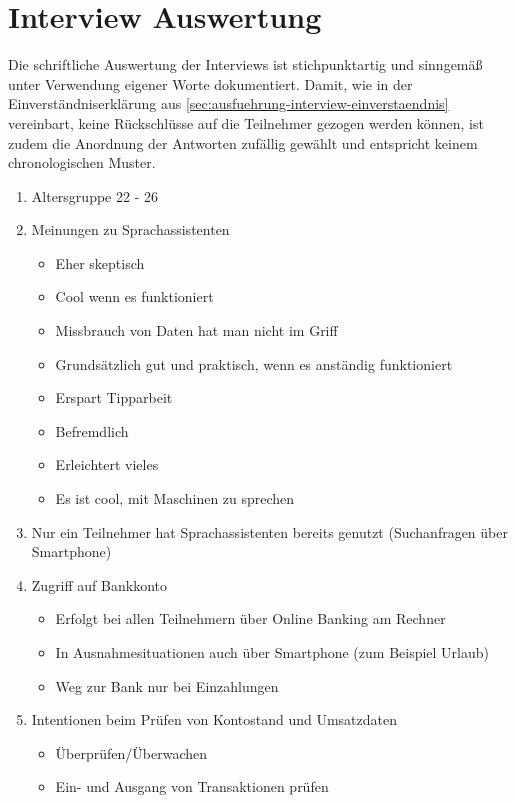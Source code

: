\section{Interview Auswertung}
\label{sec:ausfuehrung-interview-auswertung}
Die schriftliche Auswertung der Interviews ist stichpunktartig und sinngemäß unter Verwendung eigener Worte dokumentiert. Damit, wie in der Einverständniserklärung aus \ref{sec:ausfuehrung-interview-einverstaendnis} vereinbart, keine Rückschlüsse auf die Teilnehmer gezogen werden können, ist zudem die Anordnung der Antworten zufällig gewählt und entspricht keinem chronologischen Muster. 

\begin{enumerate}
    \item Altersgruppe 22 - 26
    \item Meinungen zu Sprachassistenten
    \begin{itemize}
        \item Eher skeptisch
        \item Cool wenn es funktioniert
        \item Missbrauch von Daten hat man nicht im Griff
        \item Grundsätzlich gut und praktisch, wenn es anständig funktioniert
        \item Erspart Tipparbeit
        \item Befremdlich
        \item Erleichtert vieles
        \item Es ist cool, mit Maschinen zu sprechen
    \end{itemize}
    \item Nur ein Teilnehmer hat Sprachassistenten bereits genutzt (Suchanfragen über Smartphone)
    \item Zugriff auf Bankkonto
    \begin{itemize}
        \item Erfolgt bei allen Teilnehmern über Online Banking am Rechner
        \item In Ausnahmesituationen auch über Smartphone (zum Beispiel Urlaub)
        \item Weg zur Bank nur bei Einzahlungen
    \end{itemize}
    \item Intentionen beim Prüfen von Kontostand und Umsatzdaten
    \begin{itemize}
        \item Überprüfen/Überwachen
        \item Ein- und Ausgang von Transaktionen prüfen

\end{itemize}
\end{enumerate}
